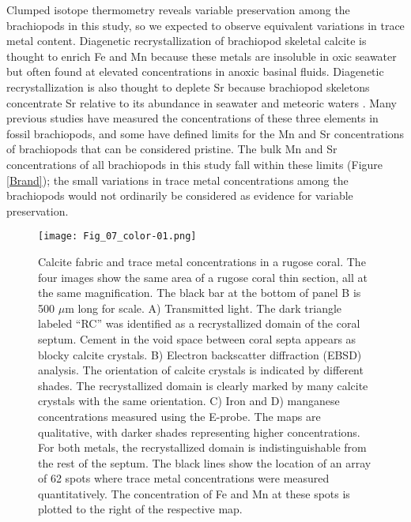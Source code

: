 \documentclass[5p, authoryear]{elsarticle}
\begin{document}
Clumped isotope thermometry reveals variable preservation among the brachiopods in this study, so we expected to observe equivalent variations in trace metal content. Diagenetic recrystallization of brachiopod skeletal calcite is thought to enrich Fe and Mn because these metals are insoluble in oxic seawater but often found at elevated concentrations in anoxic basinal fluids. Diagenetic recrystallization is also thought to deplete Sr because brachiopod skeletons concentrate Sr relative to its abundance in seawater and meteoric waters \citep{Brand1980, Shields2003}. Many previous studies have measured the concentrations of these three elements in fossil brachiopods, and some have defined limits for the Mn and Sr concentrations of brachiopods that can be considered pristine. The bulk Mn and Sr concentrations of all brachiopods in this study fall within these limits (Figure \ref{Brand}); the small variations in trace metal concentrations among the brachiopods would not ordinarily be considered as evidence for variable preservation. 

\begin{figure*}[tb]
\centering
\texttt{[image: Fig\_07\_color-01.png]}
\caption{Calcite fabric and trace metal concentrations in a rugose coral. The four images show the same area of a rugose coral thin section, all at the same magnification. The black bar at the bottom of panel B is 500 $\mu$m long for scale. A) Transmitted light. The dark triangle labeled ``RC'' was identified as a recrystallized domain of the coral septum. Cement in the void space between coral septa appears as blocky calcite crystals. B) Electron backscatter diffraction (EBSD) analysis. The orientation of calcite crystals is indicated by different shades. The recrystallized domain is clearly marked by many calcite crystals with the same orientation. C) Iron and D) manganese concentrations measured using the E-probe. The maps are qualitative, with darker shades representing higher concentrations. For both metals, the recrystallized domain is indistinguishable from the rest of the septum. The black lines show the location of an array of 62 spots where trace metal concentrations were measured quantitatively. The concentration of Fe and Mn at these spots is plotted to the right of the respective map.}
\label{EBSD_coral}
\end{figure*}
\end{document}
